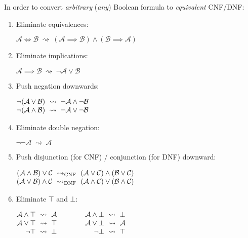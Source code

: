 \documentclass[a4paper,10pt]{article}
\begin{document}
In order to convert \emph{arbitrary} (\ie \emph{any}) Boolean formula to \emph{equivalent} CNF/DNF:
\begin{enumerate}[topsep=2pt, itemsep=2pt]
    \item Eliminate equivalences:
    \par$\mathcal{A} \iff \mathcal{B} ~\rightsquigarrow~ (\mathcal{A} \implies \mathcal{B}) \land (\mathcal{B} \implies \mathcal{A})$

    \item Eliminate implications:
    \par$\mathcal{A} \implies \mathcal{B} ~\rightsquigarrow~ \neg\mathcal{A} \lor \mathcal{B}$

    \item Push negation downwards:
    \par\(\openup-\jot\begin{aligned}[t]
        \neg(\mathcal{A} \lor \mathcal{B}) &~\rightsquigarrow~ \neg\mathcal{A} \land \neg\mathcal{B} \\
        \neg(\mathcal{A} \land \mathcal{B}) &~\rightsquigarrow~ \neg\mathcal{A} \lor \neg\mathcal{B}
    \end{aligned}\)

    \item Eliminate double negation:
    \par$\neg\neg\mathcal{A} ~\rightsquigarrow~ \mathcal{A}$

    \item Push disjunction (for CNF) / conjunction (for DNF) downward:
    \par\(\openup-\jot\begin{aligned}[t]
        (\mathcal{A} \land \mathcal{B}) \lor \mathcal{C} ~\rightsquigarrow_{\textrm{CNF}}~ (\mathcal{A} \lor \mathcal{C}) \land (\mathcal{B} \lor \mathcal{C}) \\
        (\mathcal{A} \lor \mathcal{B}) \land \mathcal{C} ~\rightsquigarrow_{\textrm{DNF}}~ (\mathcal{A} \land \mathcal{C}) \lor (\mathcal{B} \land \mathcal{C}) \\
    \end{aligned}\)

    \item Eliminate $\top$ and $\bot$:
    \par\(\openup-\jot\begin{aligned}[t]
        \mathcal{A} \land \top &~\rightsquigarrow~ \mathcal{A} &\qquad&&
        \mathcal{A} \land \bot &~\rightsquigarrow~ \bot \\
        \mathcal{A} \lor \top &~\rightsquigarrow~ \top &\qquad&&
        \mathcal{A} \lor \bot &~\rightsquigarrow~ \mathcal{A} \\
        \neg\top &~\rightsquigarrow~ \bot &\qquad&&
        \neg\bot &~\rightsquigarrow~ \top
    \end{aligned}\)
\end{enumerate}
\end{document}
